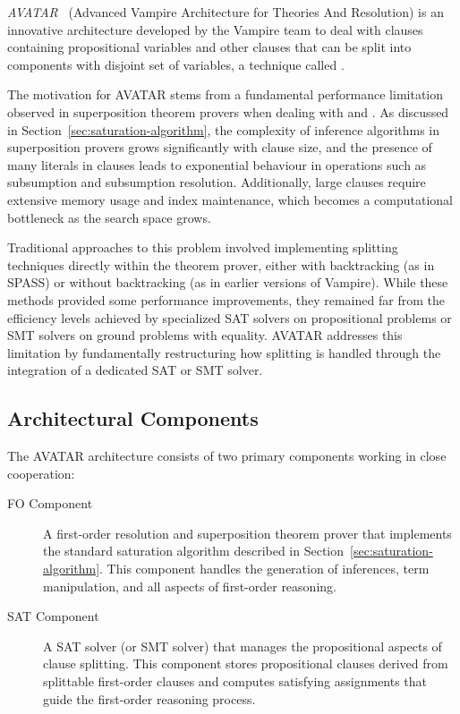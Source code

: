 \emph{AVATAR}~\cite{AVATAR} (Advanced Vampire Architecture for Theories And Resolution) is an innovative architecture developed by the Vampire team to deal with clauses containing propositional variables and other clauses that can be split into components with disjoint set of variables, a technique called .

The motivation for AVATAR stems from a fundamental performance limitation observed in superposition theorem provers when dealing with  and .
As discussed in Section~\ref{sec:saturation-algorithm}, the complexity of inference algorithms in superposition provers grows significantly with clause size, and the presence of many literals in clauses leads to exponential behaviour in operations such as subsumption and subsumption resolution.
Additionally, large clauses require extensive memory usage and index maintenance, which becomes a computational bottleneck as the search space grows.

Traditional approaches to this problem involved implementing splitting techniques directly within the theorem prover, either with backtracking (as in SPASS) or without backtracking (as in earlier versions of Vampire).
While these methods provided some performance improvements, they remained far from the efficiency levels achieved by specialized SAT solvers on propositional problems or SMT solvers on ground problems with equality.
AVATAR addresses this limitation by fundamentally restructuring how splitting is handled through the integration of a dedicated SAT or SMT solver.

\subsection{Architectural Components}\label{subsec:avatar-components}

The AVATAR architecture consists of two primary components working in close cooperation:

\begin{description}
  \item[FO Component] A first-order resolution and superposition theorem prover that implements the standard saturation algorithm described in Section~\ref{sec:saturation-algorithm}.
                     This component handles the generation of inferences, term manipulation, and all aspects of first-order reasoning.
  \item[SAT Component] A SAT solver (or SMT solver) that manages the propositional aspects of clause splitting.
                       This component stores propositional clauses derived from splittable first-order clauses and computes satisfying assignments that guide the first-order reasoning process.
\end{description}

